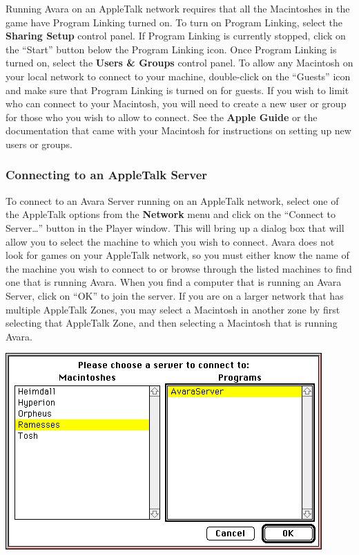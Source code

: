\documentclass{article}
\begin{document}
Running Avara on an AppleTalk network requires that all the Macintoshes in the game have Program Linking turned on. To turn on Program Linking, select the \textbf{Sharing Setup} control panel. If Program Linking is currently stopped, click on the ``Start'' button below the Program Linking icon. Once Program Linking is turned on, select the \textbf{Users \& Groups} control panel. To allow any Macintosh on your local network to connect to your machine, double-click on the ``Guests'' icon and make sure that Program Linking is turned on for guests. If you wish to limit who can connect to your Macintosh, you will need to create a new user or group for those who you wish to allow to connect. See the \textbf{Apple Guide} or the documentation that came with your Macintosh for instructions on setting up new users or groups.

\subsubsection{Connecting to an AppleTalk Server}
To connect to an Avara Server running on an AppleTalk network, select one of the AppleTalk options from the \textbf{Network} menu and click on the ``Connect to Server\dots'' button in the Player window. This will bring up a dialog box that will allow you to select the machine to which you wish to connect. Avara does not look for games on your AppleTalk network, so you must either know the name of the machine you wish to connect to or browse through the listed machines to find one that is running Avara. When you find a computer that is running an Avara Server, click on ``OK'' to join the server. If you are on a larger network that has multiple AppleTalk Zones, you may select a Macintosh in another zone by first selecting that AppleTalk Zone, and then selecting a Macintosh that is running Avara.

\begin{center}
	\includegraphics[width=\textwidth]{img/20.png}
\end{center}
\end{document}
